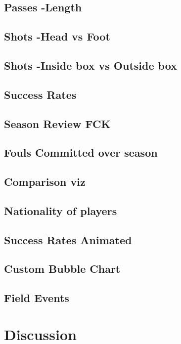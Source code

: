 \documentclass[a4paper,11pt]{article}
\begin{document}
\subsection{Passes -Length}


\subsection{Shots -Head vs Foot}


\subsection{Shots -Inside box vs Outside box}


\subsection{Success Rates}


\subsection{Season Review FCK}


\subsection{Fouls Committed over season}

\subsection{Comparison viz}

\subsection{Nationality of players}

\subsection{Success Rates Animated}

\subsection{Custom Bubble Chart}

\subsection{Field Events}

\section{Discussion}

\end{document}
